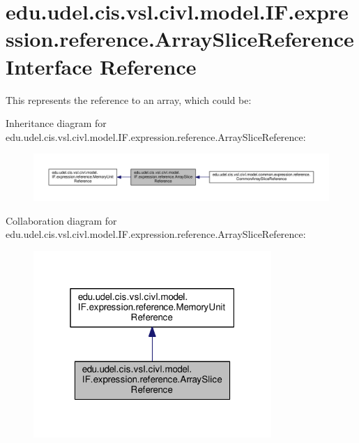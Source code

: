 \hypertarget{interfaceedu_1_1udel_1_1cis_1_1vsl_1_1civl_1_1model_1_1IF_1_1expression_1_1reference_1_1ArraySliceReference}{}\section{edu.\+udel.\+cis.\+vsl.\+civl.\+model.\+I\+F.\+expression.\+reference.\+Array\+Slice\+Reference Interface Reference}
\label{interfaceedu_1_1udel_1_1cis_1_1vsl_1_1civl_1_1model_1_1IF_1_1expression_1_1reference_1_1ArraySliceReference}


This represents the reference to an array, which could be\+:  




Inheritance diagram for edu.\+udel.\+cis.\+vsl.\+civl.\+model.\+I\+F.\+expression.\+reference.\+Array\+Slice\+Reference\+:
\nopagebreak
\begin{figure}[H]
\begin{center}
\leavevmode
\includegraphics[width=350pt]{interfaceedu_1_1udel_1_1cis_1_1vsl_1_1civl_1_1model_1_1IF_1_1expression_1_1reference_1_1ArraySliceReference__inherit__graph}
\end{center}
\end{figure}


Collaboration diagram for edu.\+udel.\+cis.\+vsl.\+civl.\+model.\+I\+F.\+expression.\+reference.\+Array\+Slice\+Reference\+:
\nopagebreak
\begin{figure}[H]
\begin{center}
\leavevmode
\includegraphics[width=256pt]{interfaceedu_1_1udel_1_1cis_1_1vsl_1_1civl_1_1model_1_1IF_1_1expression_1_1reference_1_1ArraySliceReference__coll__graph}
\end{center}
\end{figure}
